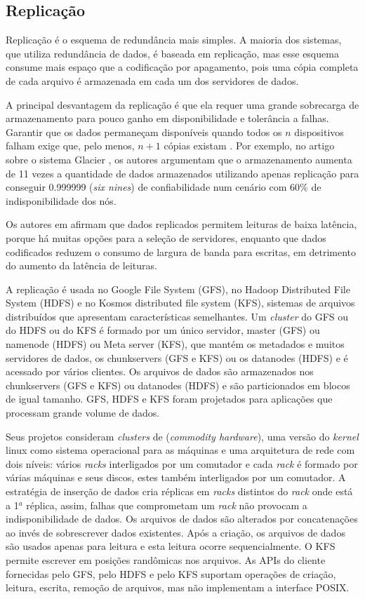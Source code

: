 \subsection{Replicação}

Replicação é o esquema de redundância mais simples. A maioria dos sistemas, que utiliza redundância de dados, é baseada em replicação, mas esse esquema consume mais espaço que a codificação por apagamento, pois uma cópia completa de cada arquivo é armazenada em cada um dos servidores de dados.

A principal desvantagem da replicação é que ela requer uma grande sobrecarga de armazenamento para pouco ganho em disponibilidade e tolerância a falhas. Garantir que os dados permaneçam disponíveis quando todos os $n$ dispositivos falham exige que, pelo menos, $n + 1$ cópias existam \cite{Woitaszek:2007}. Por exemplo, no artigo sobre o sistema Glacier \cite{Haeberlen:2005}, os autores argumentam que o armazenamento aumenta de 11 vezes a quantidade de dados armazenados utilizando apenas replicação para conseguir 0.999999 (\emph{six nines}) de confiabilidade num cenário com 60\% de indisponibilidade dos nós.

Os autores em \cite{Dabek:2004} afirmam que dados replicados permitem leituras de baixa latência, porque há muitas opções para a seleção de servidores, enquanto que dados codificados reduzem o consumo de largura de banda para escritas, em detrimento do aumento da latência de leituras.

A replicação é usada no Google File System \cite{Ghemawat:2003} (GFS), no Hadoop Distributed File System \cite{Hadoop:2010} (HDFS) e no Kosmos distributed file system \cite{TKDFS:2011} (KFS), sistemas de arquivos distribuídos que apresentam características semelhantes. Um \emph{cluster} do GFS ou do HDFS ou do KFS é formado por um único servidor, master (GFS) ou namenode (HDFS) ou Meta server (KFS), que mantém os metadados e muitos servidores de dados, os chunkservers (GFS e KFS) ou os datanodes (HDFS) e é acessado por vários clientes. Os arquivos de dados são armazenados nos chunkservers (GFS e KFS) ou datanodes (HDFS) e são particionados em blocos de igual tamanho. GFS, HDFS e KFS foram projetados para aplicações que processam grande volume de dados. 

Seus projetos consideram \emph{clusters} de (\emph{commodity hardware}), uma versão do \emph{kernel} linux como sistema operacional para as máquinas e uma arquitetura de rede com dois níveis: vários \emph{racks} interligados por um comutador e cada \emph{rack} é formado por várias máquinas e seus discos, estes também interligados por um comutador. A estratégia de inserção de dados cria réplicas em \emph{racks} distintos do \emph{rack} onde está a 1$^a$ réplica, assim, falhas que comprometam um \emph{rack} não provocam a indisponibilidade de dados. Os arquivos de dados são alterados por concatenações ao invés de sobrescrever dados existentes. Após a criação, os arquivos de dados são usados apenas para leitura e esta leitura ocorre sequencialmente. O KFS permite escrever em posições randômicas nos arquivos. As APIs do cliente fornecidas pelo GFS, pelo HDFS e pelo KFS suportam operações de criação, leitura, escrita, remoção de arquivos, mas não implementam a interface POSIX.

